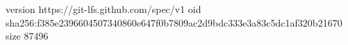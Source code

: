 version https://git-lfs.github.com/spec/v1
oid sha256:f385e2396604507340860e647f0b7809ac2d9bdc333e3a83c5dc1af320b21670
size 87496
